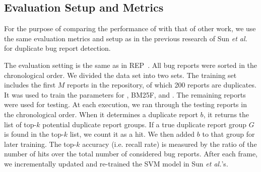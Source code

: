 



\subsection{Evaluation Setup and Metrics}

For the purpose of comparing the performance of {\model} with that of
other work, we use the same evaluation metrics and setup as in the
previous research of Sun {\em et al.}~\cite{davidlo10} for duplicate
bug report detection. 

The evaluation setting is the same as in REP~\cite{sun-ase11}.  All
bug reports were sorted in the chronological order. We divided the
data set into two sets.  The training set includes the first $M$
reports in the repository, of which 200 reports are duplicates.  It
was used to train the parameters for {\model}, BM25F, and
{\model}. The remaining reports were used for testing. At each
execution, we ran {\model} through the testing reports in the
chronological order. When it determines a duplicate report $b$, it
returns the list of top-$k$ potential duplicate report groups. If a
true duplicate report group $G$ is found in the top-$k$ list, we count
it as a hit. We then added $b$ to that group for later training. The
top-$k$ accuracy (i.e. recall rate) is measured by the ratio of the
number of hits over the total number of considered bug reports.  After
each frame, we incrementally updated {\model} and re-trained the SVM
model in Sun {\em et al.}'s.


